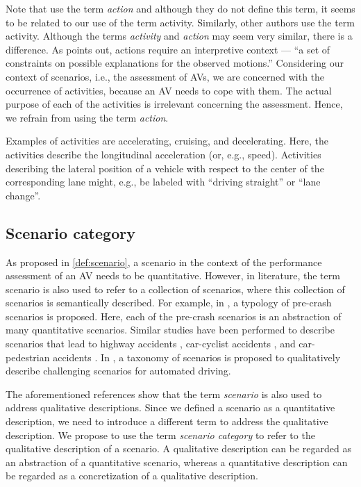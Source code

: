 Note that \textcite{geyer2014, ulbrich2015} use the term \emph{action} and although they do not define this term, it seems to be related to our use of the term activity. Similarly, other authors \autocite{sigsim2019glossary, catapult2018musicc, elrofai2018scenario} use the term activity. Although the terms \emph{activity} and \emph{action} may seem very similar, there is a difference. As \textcite{bobick1997movement} points out, actions require an interpretive context --- ``a set of constraints on possible explanations for the observed motions.''
Considering our context of scenarios, i.e., the assessment of AVs, we are concerned with the occurrence of activities, because an AV needs to cope with them. The actual purpose of each of the activities is irrelevant concerning the assessment. Hence, we refrain from using the term \emph{action}.

Examples of activities are accelerating, cruising, and decelerating. Here, the activities describe the longitudinal acceleration (or, e.g., speed). Activities describing the lateral position of a vehicle with respect to the center of the  corresponding lane  might, e.g., be labeled with ``driving straight'' or ``lane change''.




\subsection{Scenario category}
\label{sec:scenario category}

As proposed in \cref{def:scenario}, a scenario in the context of the performance assessment of an AV needs to be quantitative. 
However, in literature, the term scenario is also used to refer to a collection of scenarios, where this collection of scenarios is semantically described. For example, in \autocite{USDoT2007precrashscenarios}, a typology of pre-crash scenarios is proposed. Here, each of the pre-crash scenarios is an abstraction of many quantitative scenarios. Similar studies have been performed to describe scenarios that lead to highway accidents \autocite{adaptive2017d73}, car-cyclist accidents \autocite{opdencamp2014cats}, and car-pedestrian accidents \autocite{lenard2014typical}. In \autocite{catapult2017taxonomy}, a taxonomy of scenarios is proposed to qualitatively describe challenging scenarios for automated driving.

The aforementioned references \autocite{USDoT2007precrashscenarios, adaptive2017d73, opdencamp2014cats, lenard2014typical, catapult2017taxonomy} show that the term \emph{scenario} is also used to address qualitative descriptions. Since we defined a scenario as a quantitative description, we need to introduce a different term to address the qualitative description. We propose to use the term \emph{scenario category} to refer to the qualitative description of a scenario. A qualitative description can be regarded as an abstraction of a quantitative scenario, whereas a quantitative description can be regarded as a concretization of a qualitative description.

